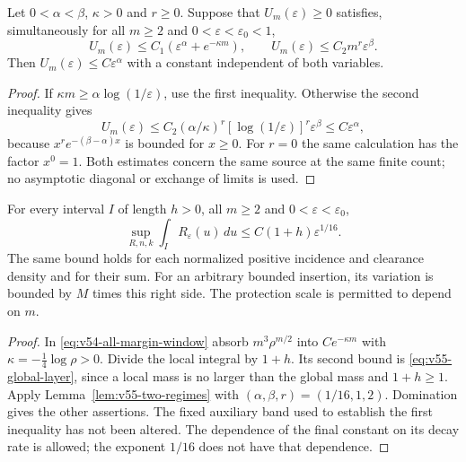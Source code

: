 \begin{lemma}
\label{lem:v55-two-regimes}
Let $0<\alpha<\beta$, $\kappa>0$ and $r\ge0$. Suppose that
$U_m(\varepsilon)\ge0$ satisfies, simultaneously for all $m\ge2$
and $0<\varepsilon<\varepsilon_0<1$,
\[
 U_m(\varepsilon)\le C_1(\varepsilon^\alpha+e^{-\kappa m}),
 \qquad U_m(\varepsilon)\le C_2 m^r\varepsilon^\beta.
\]
Then $U_m(\varepsilon)\le C\varepsilon^\alpha$ with a constant
independent of both variables.
\end{lemma}
\begin{proof}
If $\kappa m\ge\alpha\log(1/\varepsilon)$, use the first inequality.
Otherwise the second inequality gives
\[
 U_m(\varepsilon)\le
 C_2(\alpha/\kappa)^r[\log(1/\varepsilon)]^r\varepsilon^\beta
 \le C\varepsilon^\alpha,
\]
because $x^r e^{-(\beta-\alpha)x}$ is bounded for $x\ge0$.
For $r=0$ the same calculation has the factor $x^0=1$.
Both estimates concern the same source at the same finite count;
no asymptotic diagonal or exchange of limits is used.
\end{proof}

\begin{theorem}
\label{thm:v55-error-free-mass}
For every interval $I$ of length $h>0$, all $m\ge2$ and
$0<\varepsilon<\varepsilon_0$,
\begin{equation}\label{eq:v55-error-free-mass}
 \sup_{R,n,k}\int_I R_\varepsilon(u)\,du
                       \le C(1+h)\varepsilon^{1/16}.
\end{equation}
The same bound holds for each normalized positive incidence and
clearance density and for their sum. For an arbitrary bounded
insertion, its variation is bounded by $M$ times this right side.
The protection scale is permitted to depend on $m$.
\end{theorem}
\begin{proof}
In \eqref{eq:v54-all-margin-window} absorb
$m^3\rho^{m/2}$ into $Ce^{-\kappa m}$ with
$\kappa=-\frac14\log\rho>0$. Divide the local integral by $1+h$.
Its second bound is \eqref{eq:v55-global-layer}, since a local mass
is no larger than the global mass and $1+h\ge1$. Apply
Lemma~\ref{lem:v55-two-regimes} with
$(\alpha,\beta,r)=(1/16,1,2)$. Domination gives the other assertions.
The fixed auxiliary band used to establish the first inequality has
not been altered. The dependence of the final constant on its decay
rate is allowed; the exponent $1/16$ does not have that dependence.
\end{proof}

